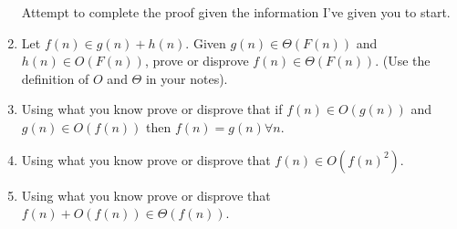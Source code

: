 \documentclass[12pt]{article}
\begin{document}
\begin{enumerate}
Attempt to complete the proof given the information I've given you to start.
\newpage
\item Let $f(n) \in g(n) + h(n)$. Given $g(n) \in \Theta (F(n))$ and $h(n) \in O(F(n))$, prove or 
disprove $f(n) \in \Theta(F(n))$. (Use the definition of $O$ and $\Theta$ in your notes).
\newpage
\item Using what you know prove or disprove that  if $f(n) \in O(g(n)) $ and $g(n) \in O(f(n))$ then $f(n) = g(n) \forall n$.
\newpage
\item Using what you know prove or disprove that $f(n)\in O(f(n)^2)$.
\newpage
\item Using what you know prove or disprove that $f(n) + O(f(n)) \in \Theta(f(n))$.
\end{enumerate}
\end{document}
